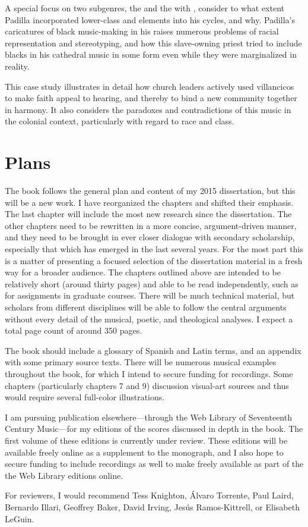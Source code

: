 \documentclass{vcbook-proposal}
\begin{document}
A special focus on two subgenres, the  and the  with , consider to what extent Padilla incorporated lower-class and  elements into his cycles, and why.
Padilla's caricatures of black music-making in his  raises numerous problems of racial representation and stereotyping, and how this slave-owning priest tried to include blacks in his cathedral music in some form even while they were marginalized in reality.

This case study illustrates in detail how church leaders actively used villancicos to make faith appeal to hearing, and thereby to bind a new community together in harmony.
It also considers the paradoxes and contradictions of this music in the colonial context, particularly with regard to race and class.

\section{Plans}

The book follows the general plan and content of my 2015 dissertation, but this will be a new work.%
  \autocite{Cashner:PhD}
I have reorganized the chapters and shifted their emphasis.
The last chapter will include the most new research since the dissertation.
The other chapters need to be rewritten in a more concise, argument-driven manner, and they need to be brought in ever closer dialogue with secondary scholarship, especially that which has emerged in the last several years.
For the most part this is a matter of presenting a focused selection of the dissertation material in a fresh way for a broader audience.
The chapters outlined above are intended to be relatively short (around thirty pages) and able to be read independently, such as for assignments in graduate courses.
There will be much technical material, but scholars from different disciplines will be able to follow the central arguments without every detail of the musical, poetic, and theological analyses.
I expect a total page count of around 350 pages.

The book should include a glossary of Spanish and Latin terms, and an appendix with some primary source texts.
There will be numerous musical examples throughout the book, for which I intend to secure funding for recordings.
Some chapters (particularly chapters 7 and 9) discussion visual-art sources and thus would require several full-color illustrations.

I am pursuing publication elsewhere---through the Web Library of Seventeenth Century Music---for my editions of the scores discussed in depth in the book. 
The first volume of these editions is currently under review.
These editions will be available freely online as a supplement to the monograph, and I also hope to secure funding to include recordings as well to make freely available as part of the the Web Library editions online.

For reviewers, I would recommend Tess Knighton, Álvaro Torrente, Paul Laird, Bernardo Illari, Geoffrey Baker, David Irving, Jesús Ramos-Kittrell, or Elisabeth LeGuin.

\myprintbibliography
\end{document}
